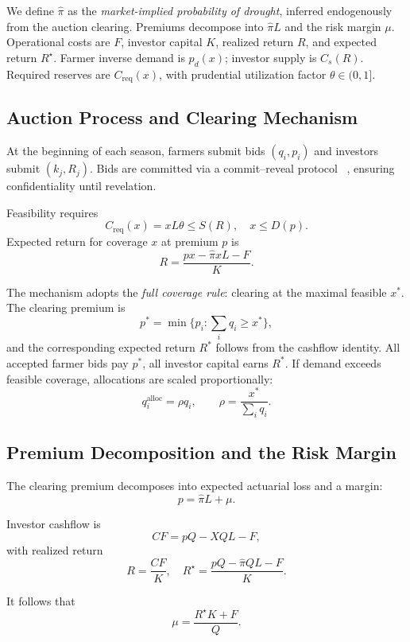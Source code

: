 \documentclass[11pt,a4paper]{article}
\begin{document}
		We define $\hat{\pi}$ as the \emph{market-implied probability of drought}, inferred endogenously from the auction clearing.
		Premiums decompose into $\hat{\pi}L$ and the risk margin $\mu$.
		Operational costs are $F$, investor capital $K$, realized return $R$, and expected return $R^\star$.
		Farmer inverse demand is $p_d(x)$; investor supply is $C_s(R)$.
		Required reserves are $C_{\mathrm{req}}(x)$, with prudential utilization factor $\theta \in (0,1]$.

		\subsection{Auction Process and Clearing Mechanism}\label{subsec:auction-process-and-clearing-mechanism}

		At the beginning of each season, farmers submit bids $(q_i, p_i)$ and investors submit $(k_j, R_j)$.
		Bids are committed via a commit--reveal protocol ~\parencite{blum1983coinflipping,buterin2015commit,parkes2014mechanism}, ensuring confidentiality until revelation.

		Feasibility requires
		\[
			C_{\mathrm{req}}(x) = xL\theta \leq S(R), \quad x \leq D(p).
		\]
		Expected return for coverage $x$ at premium $p$ is
		\[
			R = \frac{px - \hat{\pi}xL - F}{K}.
		\]

		The mechanism adopts the \emph{full coverage rule}: clearing at the maximal feasible $x^\ast$.
		The clearing premium is
		\[
			p^\ast = \min\{p_i : \sum_i q_i \geq x^\ast\},
		\]
		and the corresponding expected return $R^\ast$ follows from the cashflow identity.
		All accepted farmer bids pay $p^\ast$, all investor capital earns $R^\ast$.
		If demand exceeds feasible coverage, allocations are scaled proportionally:
		\[
			q_i^{\text{alloc}} = \rho q_i, \qquad \rho = \frac{x^\ast}{\sum_i q_i}.
		\]

		\subsection{Premium Decomposition and the Risk Margin}\label{subsec:premium-decomposition-and-the-risk-margin}

		The clearing premium decomposes into expected actuarial loss and a margin:
		\[
			p = \hat{\pi}L + \mu.
		\]

		Investor cashflow is
		\[
			CF = pQ - XQL - F,
		\]
		with realized return
		\[
			R = \frac{CF}{K}, \quad
			R^\star = \frac{pQ - \hat{\pi}QL - F}{K}.
		\]

		It follows that
		\[
			\mu = \frac{R^\star K + F}{Q}.
		\]
\end{document}
